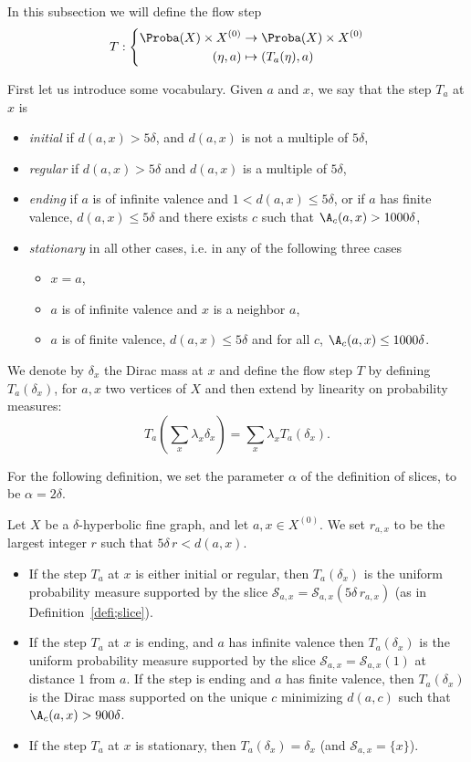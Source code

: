 In this subsection we will define the flow step
\[
T: \left\{
\begin{aligned} \Proba(X) \times X^{(0)} & \to \Proba(X) \times X^{(0)} \\
(\eta, a) & \mapsto (T_a(\eta), a)
\end{aligned} \right.
\]

First let us introduce some vocabulary. Given $a$ and $x$, we say that the step $T_a$ at $x$ is
\begin{itemize}
\item \emph{initial} if $d(a,x)>5\delta$, and $d(a,x)$ is not a multiple of $5\delta$,
\item \emph{regular} if $d(a,x)>5\delta$ and $d(a,x)$ is a multiple of $5\delta$,
\item \emph{ending} if $a$ is of infinite valence and $1<d(a,x)\leq 5\delta$, or if $a$ has finite valence, $d(a,x) \leq 5\delta$ and there exists $c$ such that $\A_c(a,x) > 1000\delta$,
\item \emph{stationary} in all other cases, i.e. in any of the following three cases
\begin{itemize}
\item[$\bullet$] $x=a$,
\item[$\bullet$] $a$ is of infinite valence and $x$ is a neighbor $a$,
\item[$\bullet$] $a$ is of finite valence, $d(a,x) \leq 5\delta$ and for all $c$, $\A_c(a,x) \leq1000\delta$.
\end{itemize}
\end{itemize}
We denote by
$\delta_x $ the Dirac mass at $x$ and define the flow step $T$ by defining $T_a(\delta_x)$, for $a, x$ two vertices of $X$ and then extend by linearity on probability measures:
\[
T_a\left(\sum_x \lambda_x \delta_x\right) = \sum_x \lambda_x T_a(\delta_x).
\]

For the following definition, we set the parameter $\alpha$ of the definition of slices, to be $\alpha = 2\delta$.

\begin{defi}\label{defi:flowstep}
Let $X$ be a $\delta$-hyperbolic fine graph, and let $a,x\in X^{(0)}$. We set $r_{a,x}$ to be the largest integer $r$
such that $5\delta\,r < d(a,x)$.
\begin{itemize}
\item If the step $T_a$ at $x$ is either initial or regular, then $T_a(\delta_x)$ is the uniform probability measure supported by the slice $\mathcal{S}_{a,x}=\mathcal{S}_{a,x}(5\delta\,r_{a,x})$ (as in Definition~\ref{defi;slice}).
\item If the step $T_a$ at $x$ is ending, and $a$ has infinite valence then $T_a(\delta_x)$ is the uniform probability measure supported by the slice $\mathcal{S}_{a,x} = \mathcal{S}_{a,x}(1)$ at distance $1$ from $a$. If the step is ending and $a$ has finite valence, then $T_a(\delta_x)$ is the Dirac mass supported on the unique $c$ minimizing $d(a,c)$ such that $\A_c(a,x) > 900\delta$.
\item If the step $T_a$ at $x$ is stationary, then $T_a(\delta_x) =
\delta_x$ (and $\mathcal{S}_{a,x} = \{x\}$).
\end{itemize}
\end{defi}

